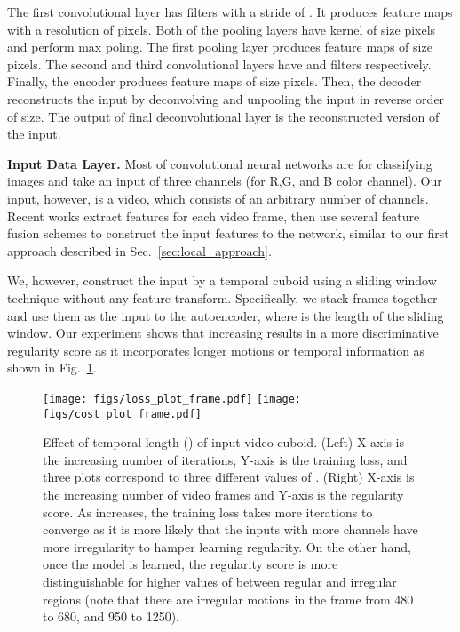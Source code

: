 \documentclass[10pt,twocolumn,letterpaper]{article}
\begin{document}
The first convolutional layer has  filters with a stride of . 
It produces  feature maps with a resolution of  pixels. 
Both of the pooling layers have kernel of size  pixels and perform max poling. 
The first pooling layer produces  feature maps of size  pixels. The second and third convolutional layers have  and  filters respectively. 
Finally, the encoder produces  feature maps of size  pixels. 
Then, the decoder reconstructs the input by deconvolving and unpooling the input in reverse order of size. 
The output of final deconvolutional layer is the reconstructed version of the input. 

\vspace{.5em}
\noindent \textbf{Input Data Layer.}
Most of convolutional neural networks are for classifying images and take an input of three channels (for R,G, and B color channel). 
Our input, however, is a video, which consists of an arbitrary number of channels.
Recent works \cite{karpathyTSLSF14,donahue2014long} extract features for each video frame, then use several feature fusion schemes to construct the input features to the network, similar to our first approach described in Sec.~\ref{sec:local_approach}.

We, however, construct the input by a temporal cuboid using a sliding window technique without any feature transform. 
Specifically, we stack  frames together and use them as the input to the autoencoder, where  is the length of the sliding window. 
Our experiment shows that increasing  results in a more discriminative regularity score as it incorporates longer motions or temporal information as shown in Fig.~\ref{fig:trloss_n}.

\begin{figure}[h]
	\centering
	\texttt{[image: figs/loss\_plot\_frame.pdf]}
	\texttt{[image: figs/cost\_plot\_frame.pdf]}
	\caption{Effect of temporal length () of input video cuboid. (Left) X-axis is the increasing number of iterations, Y-axis is the training loss, and three plots correspond to three different values of . (Right) X-axis is the increasing number of video frames and Y-axis is the regularity score. As  increases, the training loss takes more iterations to converge as it is more likely that the inputs with more channels have more irregularity to hamper learning regularity. On the other hand, once the model is learned, the regularity score is more distinguishable for higher values of  between regular and irregular regions (note that there are irregular motions in the frame from 480 to 680, and 950 to 1250).}
	\vspace{-4mm}
	\label{fig:trloss_n}
\end{figure}
\end{document}

